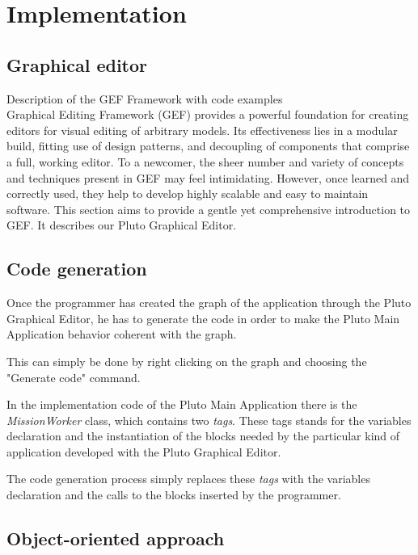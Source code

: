\chapter{Implementation}
\label{cap5}



\section{Graphical editor}\label{editor}

Description of the GEF Framework with code examples
\\
Graphical Editing Framework (GEF) provides a powerful foundation for creating editors for visual editing of arbitrary models. Its effectiveness lies in a modular build, fitting use of design patterns, and decoupling of components that comprise a full, working editor. To a newcomer, the sheer number and variety of concepts and techniques present in GEF may feel intimidating. However, once learned and correctly used, they help to develop highly scalable and easy to maintain software. This section aims to provide a gentle yet comprehensive introduction to GEF. It describes our Pluto Graphical Editor.


\section{Code generation}\label{codeGeneration}


Once the programmer has created the graph of the application through the Pluto Graphical Editor, he has to generate the code in order to make the Pluto Main Application behavior coherent with the graph.

This can simply be done by right clicking on the graph and choosing the "Generate code" command.

In the implementation code of the Pluto Main Application there is the \textit{MissionWorker} class, which contains two \textit{tags}.
These tags stands for the variables declaration and the instantiation of the blocks needed by the particular kind of application developed with the Pluto Graphical Editor.

The code generation process simply replaces these \textit{tags} with the variables declaration and the calls to the blocks inserted by the programmer.




\section{Object-oriented approach}\label{oomodel}

